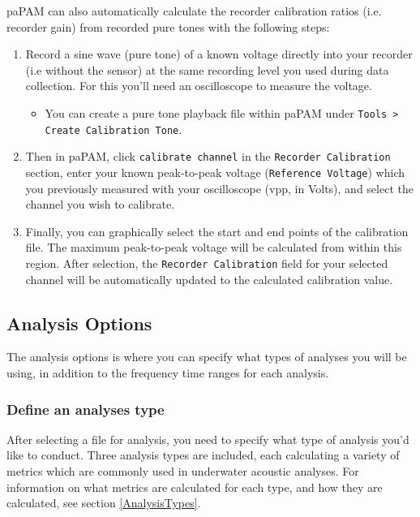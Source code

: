 \documentclass[11pt]{report}
\begin{document}
paPAM can also automatically calculate the recorder calibration ratios (i.e. recorder gain) from recorded pure tones with the following steps:
\begin{enumerate}
\item Record a sine wave (pure tone) of a known voltage directly into your recorder (i.e without the sensor) at the same recording level you used during data collection. For this you'll need an oscilloscope to measure the voltage.

\begin{itemize}
\item You can create a pure tone playback file within paPAM under \texttt{Tools > Create Calibration Tone}.
\end{itemize}

\item Then in paPAM, click \texttt{calibrate channel} in the \texttt{Recorder Calibration} section, enter your known peak-to-peak voltage (\texttt{Reference Voltage}) which you previously measured with your oscilloscope (vpp, in Volts), and select the channel you wish to calibrate.

\item Finally, you can graphically select the start and end points of the calibration file.  The maximum peak-to-peak voltage will be calculated from within this region.  After selection, the \texttt{Recorder Calibration} field for your selected channel will be automatically updated to the calculated calibration value.
\end{enumerate}	 

\subsection{Analysis Options}
The analysis options is where you can specify what types of analyses you will be using, in addition to the frequency time ranges for each analysis.

\subsubsection{Define an analyses type}
After selecting a file for analysis, you need to specify what type of analysis you'd like to conduct.  Three analysis types are included, each calculating a variety of metrics which are commonly used in underwater acoustic analyses.  For information on what metrics are calculated for each type, and how they are calculated, see section \ref{AnalysisTypes}.
\end{document}
